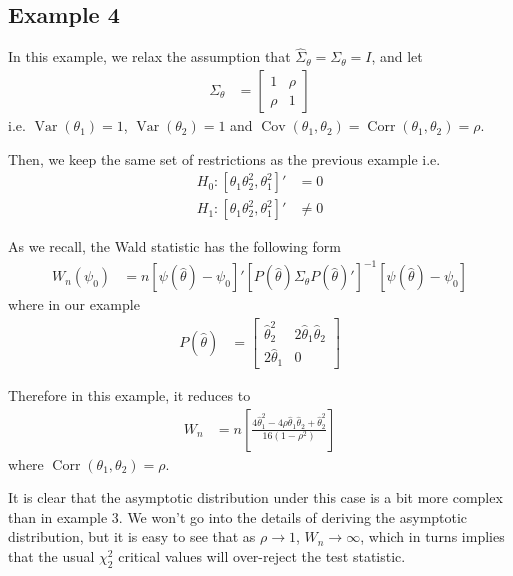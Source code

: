 \documentclass[]{article}\usepackage[]{graphicx}\usepackage[]{color}
\DeclareMathOperator{\Corr}{Corr}
\DeclareMathOperator{\Var}{Var}
\DeclareMathOperator{\Cov}{Cov}
\begin{document}
\subsection{Example 4}

In this example, we relax the assumption that $\hat{\Sigma}_\theta=\Sigma_\theta=I$, and let
\begin{align}
	\Sigma_\theta & = \left[ \begin{array}{cc}
		1 & \rho  \\
		\rho  & 1
	\end{array} \right]
\end{align}
i.e. $\Var(\theta_1)=1$, $\Var(\theta_2)=1$ and $\Cov(\theta_1,\theta_2)=\Corr(\theta_1,\theta_2)=\rho$.

Then, we keep the same set of restrictions as the previous example i.e.
\begin{align}
	H_0: [\theta_1 \theta_2^2 , \theta_1^2]' & = 0 \\
	H_1: [\theta_1 \theta_2^2 , \theta_1^2]'  & \neq 0
\end{align}

As we recall, the Wald statistic has the following form
\begin{align}
	W_n(\psi_0) & = n \left[\psi (\hat{\theta}) - \psi_0\right]' \left[P (\hat{\theta})\Sigma_\theta P (\hat{\theta})'\right]^{-1} \left[\psi (\hat{\theta}) - \psi_0\right]
\end{align}
where in our example
\begin{align}
	P(\hat{\theta}) & = \left[ \begin{array}{cc}
		\hat{\theta}_2^2 & 2\hat{\theta}_1 \hat{\theta}_2 \\
		2\hat{\theta}_1 & 0
	\end{array} \right]
\end{align}

Therefore in this example, it reduces to
\begin{align}
	W_n & = n\left[ \frac{4\hat{\theta}_1^2-4\rho\hat{\theta}_1\hat{\theta}_2+\hat{\theta}_2^2}{16(1-\rho^2)}\right]
\end{align}
where $\Corr(\theta_1,\theta_2)=\rho$.

It is clear that the asymptotic distribution under this case is a bit more complex than in example 3. We won't go into the details of deriving the asymptotic distribution, but it is easy to see that as $\rho \rightarrow 1$, $W_n \rightarrow \infty$, which in turns implies that the usual $\chi^2_2$ critical values will over-reject the test statistic.
\end{document}
